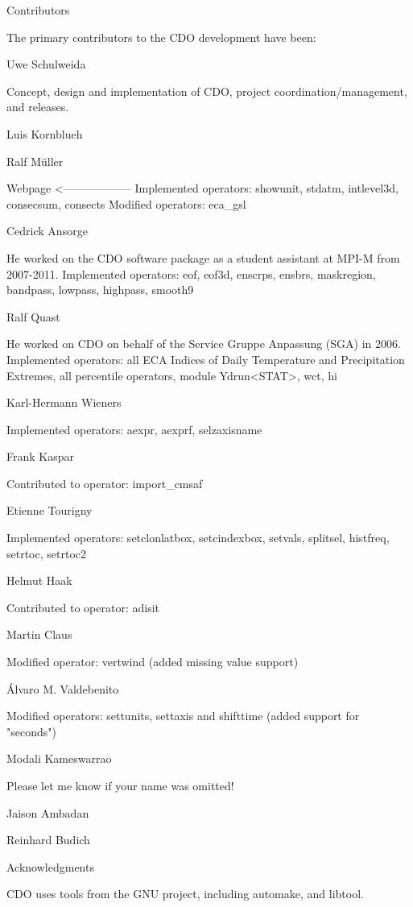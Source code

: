 Contributors

The primary contributors to the CDO development have been: 

Uwe Schulweida

Concept, design and implementation of CDO, project coordination/management, and releases.

Luis Kornblueh

Ralf Müller

Webpage <------------------
Implemented operators: showunit, stdatm, intlevel3d, consecsum, consects
Modified operators: eca_gsl

Cedrick Ansorge

He worked on the CDO software package as a student assistant at MPI-M from 2007-2011.
Implemented operators: eof, eof3d, enscrps, ensbrs, maskregion,
bandpass, lowpass, highpass, smooth9

Ralf Quast

He worked on CDO on behalf of the Service Gruppe Anpassung (SGA) in 2006.
Implemented operators: all ECA Indices of Daily Temperature and
Precipitation Extremes, all percentile operators, module Ydrun<STAT>,
wct, hi

Karl-Hermann Wieners

Implemented operators: aexpr, aexprf, selzaxisname

Frank Kaspar

Contributed to operator: import_cmsaf

Etienne Tourigny

Implemented operators: setclonlatbox, setcindexbox, setvals, splitsel, histfreq, setrtoc, setrtoc2

Helmut Haak

Contributed to operator: adisit

Martin Claus

Modified operator: vertwind (added missing value support)

Álvaro M. Valdebenito

Modified operators:  settunits, settaxis and shifttime (added support for "seconds")

Modali Kameswarrao


Please let me know if your name was omitted!


Jaison Ambadan

Reinhard Budich


Acknowledgments

CDO uses tools from the GNU project, including automake, and libtool. 
